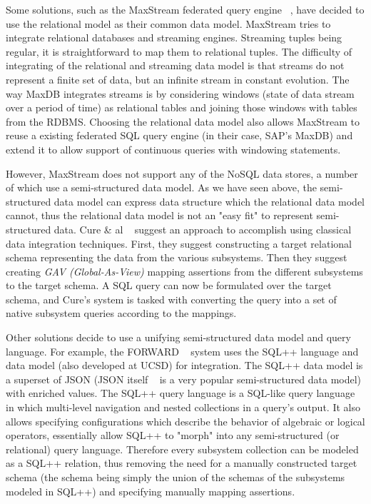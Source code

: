 Some solutions, such as the MaxStream federated query engine ~\cite{Botan2010}, have decided to use the relational model as their common data model. MaxStream tries to integrate relational databases and streaming engines. Streaming tuples being regular, it is straightforward to map them to relational tuples. The difficulty of integrating of the relational and streaming data model is that streams do not represent a finite set of data, but an infinite stream in constant evolution. The way MaxDB integrates streams is by considering windows (state of data stream over a period of time) as relational tables and joining those windows with tables from the RDBMS. Choosing the relational data model also allows MaxStream to reuse a existing federated SQL query engine (in their case, SAP's MaxDB) and extend it to allow support of continuous queries with windowing statements.

However, MaxStream does not support any of the NoSQL data stores, a number of which use a semi-structured data model. As we have seen above, the semi-structured data model can express data structure which the relational data model cannot, thus the relational data model is not an "easy fit" to represent semi-structured data. Cure \& al ~\cite{Cure2011} suggest an approach to accomplish using classical data integration techniques. First, they suggest constructing a target relational schema representing the data from the various subsystems. Then they suggest creating \emph{GAV (Global-As-View)} mapping assertions from the different subsystems to the target schema. A SQL query can now be formulated over the target schema, and Cure's system is tasked with converting the query into a set of native subsystem queries according to the mappings.

Other solutions decide to use a unifying semi-structured data model and query language. For example, the FORWARD ~\cite{Forward} system uses the SQL++ language and data model (also developed at UCSD) for integration. The SQL++ data model is a superset of JSON (JSON itself ~\cite{JSON} is a very popular semi-structured data model) with enriched values. The SQL++ query language is a SQL-like query language in which multi-level navigation and nested collections in a query's output. It also allows specifying configurations which describe the behavior of algebraic or logical operators, essentially allow SQL++ to "morph" into any semi-structured (or relational) query language. Therefore every subsystem collection can be modeled as a SQL++ relation, thus removing the need for a manually constructed target schema (the schema being simply the union of the schemas of the subsystems modeled in SQL++) and specifying manually mapping assertions.

